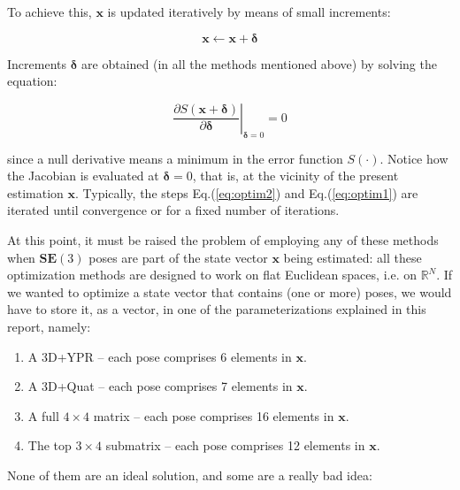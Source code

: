 \documentclass[a4paper,11pt]{report}
\newcommand{\DEL}{{\bm{\delta}}}
\begin{document}
To achieve this, $\mathbf{x}$ is updated iteratively by means of small increments:

\begin{equation}
\label{eq:optim1}
 \mathbf{x}  \leftarrow \mathbf{x} + \DEL
\end{equation}

Increments $\DEL$ are obtained
(in all the methods mentioned above)
by solving the equation:

\begin{equation}
\label{eq:optim2}
\left. \frac{\partial S(\mathbf{x} + \DEL )}{\partial \DEL }
\right|_{\DEL=0}
= 0
\end{equation}

\noindent since a null derivative means a minimum in the error function $S(\cdot)$.
Notice how the Jacobian is evaluated at $\DEL=0$, that is, at the vicinity of
the present estimation $\mathbf{x}$.
Typically, the steps Eq.(\ref{eq:optim2}) and Eq.(\ref{eq:optim1}) are
iterated until convergence or for a fixed number of iterations.

At this point, it must be raised the problem of employing any of
these methods when $\mathbf{SE}(3)$ poses
are part of the state vector $\mathbf{x}$ being estimated:
all these optimization methods are designed to work on flat Euclidean spaces, i.e. on $\mathbb{R}^N$.
If we wanted to optimize a state vector that contains (one or more) poses,
we would have to store it, as a vector, in one of the parameterizations explained in this report, namely:

\begin{enumerate}
 \item A 3D+YPR -- each pose comprises 6 elements in $\mathbf{x}$.
 \item A 3D+Quat -- each pose comprises 7 elements in $\mathbf{x}$.
 \item A full $4\times 4$ matrix -- each pose comprises 16 elements in $\mathbf{x}$.
 \item The top $3\times 4$ submatrix -- each pose comprises 12 elements in $\mathbf{x}$.
\end{enumerate}


None of them are an ideal solution, and some are a really bad idea:
\end{document}

